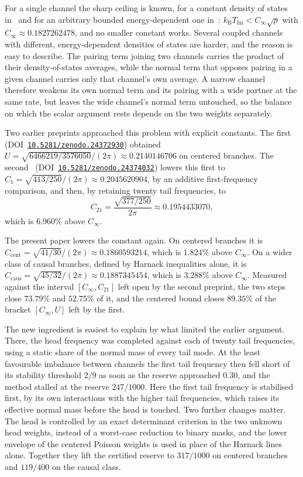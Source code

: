 \documentclass[10pt]{article}
\theoremstyle{remark}
\newcommand{\DOI}[1]{\href{https://doi.org/#1}{\nolinkurl{#1}}}
\newcommand{\kB}{k_{\mathrm B}}
\newcommand{\Tlin}{T_{\mathrm{lin}}}
\newcommand{\Cinf}{C_\infty}
\newcommand{\Ccent}{C_{\mathrm{cent}}}
\newcommand{\Ccaus}{C_{\mathrm{caus}}}
\begin{document}
For a single channel the sharp ceiling is known, for a constant density of states in~\cite{gsi} and for an arbitrary bounded energy-dependent one in~\cite{finite}: $\kB\Tlin<\Cinf\sqrt{\rho}$ with $\Cinf\approx0.1827262478$, and no smaller constant works. Several coupled channels with different, energy-dependent densities of states are harder, and the reason is easy to describe. The pairing term joining two channels carries the product of their density-of-states averages, while the normal term that opposes pairing in a given channel carries only that channel's own average. A narrow channel therefore weakens its own normal term and its pairing with a wide partner at the same rate, but leaves the wide channel's normal term untouched, so the balance on which the scalar argument rests depends on the two weights separately.

Two earlier preprints approached this problem with explicit constants. The first~\cite{predecessor} (DOI~\DOI{10.5281/zenodo.24372930}) obtained $U=\sqrt{6466219/3576050}/(2\pi)\approx0.2140146706$ on centered branches. The second~\cite{optimum} (DOI~\DOI{10.5281/zenodo.24374032}) lowers this first to $C_1=\sqrt{413/250}/(2\pi)\approx0.2045620904$, by an additive first-frequency comparison, and then, by retaining twenty tail frequencies, to
\[
C_{21}=\frac{\sqrt{377/250}}{2\pi}\approx0.1954433070,
\]
which is $6.960\%$ above $\Cinf$.

The present paper lowers the constant again. On centered branches it is $\Ccent=\sqrt{41/30}/(2\pi)\approx0.1860593214$, which is $1.824\%$ above $\Cinf$. On a wider class of causal branches, defined by Harnack inequalities alone, it is $\Ccaus=\sqrt{45/32}/(2\pi)\approx0.1887345454$, which is $3.288\%$ above $\Cinf$. Measured against the interval $[\Cinf,C_{21}]$ left open by the second preprint, the two steps close $73.79\%$ and $52.75\%$ of it, and the centered bound closes $89.35\%$ of the bracket $[\Cinf,U]$ left by the first.

The new ingredient is easiest to explain by what limited the earlier argument. There, the head frequency was completed against each of twenty tail frequencies, using a static share of the normal mass of every tail mode. At the least favourable imbalance between channels the first tail frequency then fell short of its stability threshold $2/9$ as soon as the reserve approached $0.30$, and the method stalled at the reserve $247/1000$. Here the first tail frequency is stabilised first, by its own interactions with the higher tail frequencies, which raises its effective normal mass before the head is touched. Two further changes matter. The head is controlled by an exact determinant criterion in the two unknown head weights, instead of a worst-case reduction to binary masks, and the lower envelope of the centered Poisson weights is used in place of the Harnack lines alone. Together they lift the certified reserve to $317/1000$ on centered branches and $119/400$ on the causal class.
\end{document}
